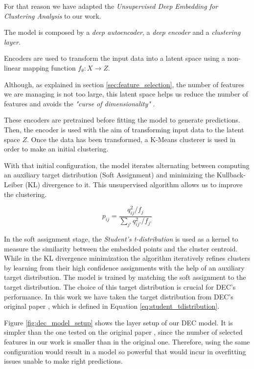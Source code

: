 \documentclass[11pt,a4paper,USenglish,twocolumn]{article}
\begin{document}
For that reason we have adapted the \emph{Unsupervised Deep Embedding for Clustering Analysis}
to our work.

The model is composed by a \emph{deep autoencoder}, a \emph{deep encoder} and
a \emph{clustering layer}.

Encoders are used to transform the input data into a latent space
using a non-linear mapping function $f_{\theta} : X \rightarrow Z$.

Although, as explained in section \ref{sec:feature_selection},
the number of features we are managing is not too large,
this latent space helps us reduce the number of features
and avoids the \emph{"curse of dimensionality"} \cite{bellman1961curse}.

These encoders are pretrained before fitting the model to generate predictions. Then,
the encoder is used with the aim of transforming input data to the latent space $Z$. Once the
data has been transformed, a K-Means clusterer is used in order to make an initial clustering.

With that initial configuration, the model iterates alternating between computing an auxiliary
target distribution (Soft Assignment) and minimizing the Kullback-Leiber (KL) divergence
\cite{kullback1951information} to it. This unsupervised algorithm allows us to improve the clustering.

\begin{equation}
  p_{ij} = \frac{q^{2}_{ij} / f_{j}}{\sum_{j'}q^{2}_{ij'}/f_{j'}}
  \label{eq:student_tdistribution}
\end{equation}

In the soft assignment stage,
the \emph{Student's t-distribution} is used as a kernel to measure the similarity
between the embedded points and the cluster centroid.
While in the KL divergence minimization the algorithm iteratively refines clusters by learning
from their high confidence assignments with the help of an auxiliary target distribution.
The model is trained by matching the soft assignment to the target distribution.
The choice of this target distribution is crucial for DEC's performance.
In this work we have taken the target distribution from DEC's original paper \cite{xie2016unsupervised},
which is defined in Equation \ref{eq:student_tdistribution}.

Figure \ref{fig:dec_model_setup} shows the layer setup of our DEC model.
It is simpler than the one tested on the original paper \cite{xie2016unsupervised},
since the number of selected features in our work is smaller than in the original one.
Therefore, using the same configuration would result in a model so
powerful that would incur in overfitting issues unable to make right predictions.
\end{document}
